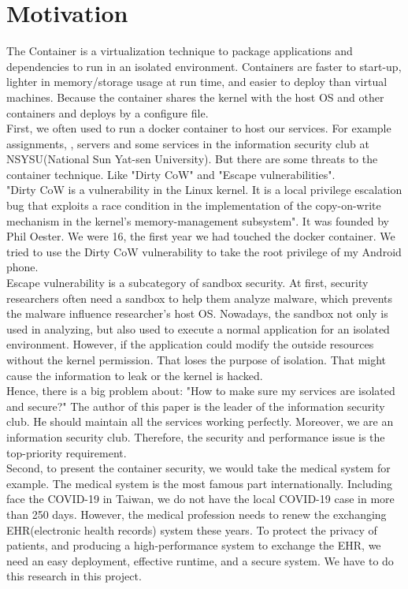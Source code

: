 \documentclass[12pt,a4paper]{IEEEconf}
\begin{document}
\section{Motivation}
The Container is a virtualization technique to package applications and dependencies to run in
an isolated environment. Containers are faster to start-up, lighter in memory/storage usage
at run time, and easier to deploy than virtual machines. Because the container shares the
kernel with the host OS and other containers and deploys by a configure file.\\
First, we often used to run a docker container to host our services. For example assignments,
, servers and some services in the information security club at NSYSU(National Sun Yat-sen University).
But there are some threats to the container technique. Like "Dirty CoW\cite{Dirty_CoW}"
and "Escape vulnerabilities".\\
"Dirty CoW is a vulnerability in the Linux kernel. It is a local privilege escalation bug
that exploits a race condition in the implementation of the copy-on-write mechanism in the
kernel's memory-management subsystem"\cite{Dirty_CoW_wiki}. It was founded by Phil Oester. We
were 16, the first year we had touched the docker container. We tried to use the Dirty CoW
vulnerability to take the root privilege of my Android phone.\\
Escape vulnerability is a subcategory of sandbox security. At first, security researchers often
need a sandbox to help them analyze malware, which prevents the malware influence researcher's
host OS. Nowadays, the sandbox not only is used in analyzing, but also used to execute a
normal application for an isolated environment. However, if the application could modify the
outside resources without the kernel permission. That loses the purpose of isolation. That
might cause the information to leak or the kernel is hacked.\\
Hence, there is a big problem about: "How to make sure my services are isolated and secure?" The
author of this paper is the leader of the information security club. He should maintain all
the services working perfectly. Moreover, we are an information security club. Therefore,
the security and performance issue is the top-priority requirement.\\
Second, to present the container security, we would take the medical system for
example.
The medical system is the most famous part internationally. Including face the COVID-19
in Taiwan, we do not have the local COVID-19 case in more than 250 days.\cite{COVID19_CNN}
However, the medical profession needs to renew the exchanging EHR(electronic health records)
system these years. To protect the privacy of patients, and producing a high-performance
system to exchange the EHR, we need an easy deployment, effective runtime, and a secure system.
We have to do this research in this project.
\end{document}
